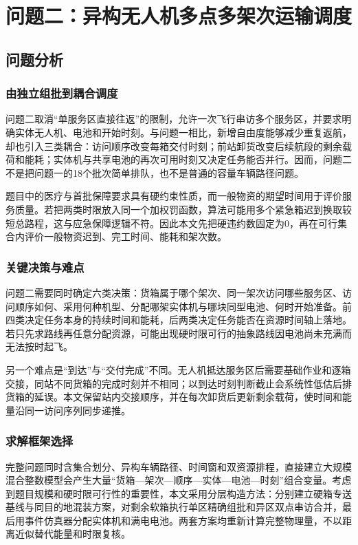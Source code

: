 \section{问题二：异构无人机多点多架次运输调度}
\subsection{问题分析}
\subsubsection{由独立组批到耦合调度}
问题二取消“单服务区直接往返”的限制，允许一次飞行串访多个服务区，并要求明确实体无人机、电池和开始时刻。与问题一相比，新增自由度能够减少重复返航，却也引入三类耦合：访问顺序改变每箱交付时刻；前站卸货改变后续航段的剩余载荷和能耗；实体机与共享电池的再次可用时刻又决定任务能否并行。因而，问题二不是把问题一的18个批次简单排队，也不是普通的容量车辆路径问题。

题目中的医疗与首批保障要求具有硬约束性质，而一般物资的期望时间用于评价服务质量。若把两类时限放入同一个加权罚函数，算法可能用多个紧急箱迟到换取较短总路程，这与应急保障逻辑不符。因此本文先把硬违约数固定为0，再在可行集合内评价一般物资迟到、完工时间、能耗和架次数。

\subsubsection{关键决策与难点}
问题二需要同时确定六类决策：货箱属于哪个架次、同一架次访问哪些服务区、访问顺序如何、采用何种机型、分配哪架实体机与哪块同型电池、何时开始准备。前四类决定任务本身的持续时间和能耗，后两类决定任务能否在资源时间轴上落地。若只先求路线再任意分配资源，可能出现硬时限可行的抽象路线因电池尚未充满而无法按时起飞。

另一个难点是“到达”与“交付完成”不同。无人机抵达服务区后需要基础作业和逐箱交接，同站不同货箱的完成时刻并不相同；以到达时刻判断截止会系统性低估后排货箱的延误。本文保留站内交接顺序，并在每次卸货后更新剩余载荷，使时间和能量沿同一访问序列同步递推。

\subsubsection{求解框架选择}
完整问题同时含集合划分、异构车辆路径、时间窗和双资源排程，直接建立大规模混合整数模型会产生大量“货箱—架次—顺序—实体—电池—时刻”组合变量。考虑到题目规模和硬时限可行性的重要性，本文采用分层构造方法：分别建立硬箱专送基线与同目的地混装方案，对剩余软箱执行单区精确组批和异区双点串访合并，最后用事件仿真器分配实体机和满电电池。两套方案均重新计算完整物理量，不以距离近似替代能量和时限复核。

